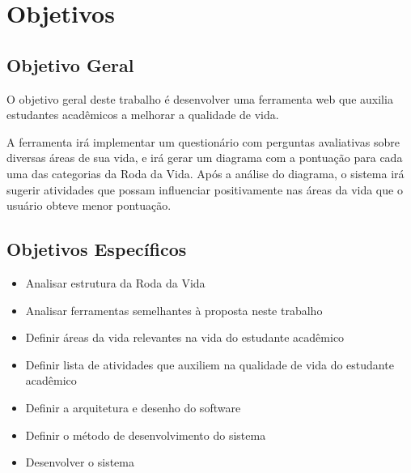 \section{Objetivos}
\subsection{Objetivo Geral}

O objetivo geral deste trabalho é desenvolver uma ferramenta web que auxilia estudantes acadêmicos a melhorar a qualidade de vida.

A ferramenta irá implementar um questionário com perguntas avaliativas sobre diversas áreas de sua vida, e irá gerar um diagrama com a pontuação para cada uma das categorias da Roda da Vida. Após a análise do diagrama, o sistema irá sugerir atividades que possam influenciar positivamente nas áreas da vida que o usuário obteve menor pontuação.

\subsection{Objetivos Específicos}
\begin{itemize}
    \item Analisar estrutura da Roda da Vida
    \item Analisar ferramentas semelhantes à proposta neste trabalho
    \item Definir áreas da vida relevantes na vida do estudante acadêmico
    \item Definir lista de atividades que auxiliem na qualidade de vida do estudante acadêmico
    \item Definir a arquitetura e desenho do software
    \item Definir o método de desenvolvimento do sistema
    \item Desenvolver o sistema
\end{itemize}
